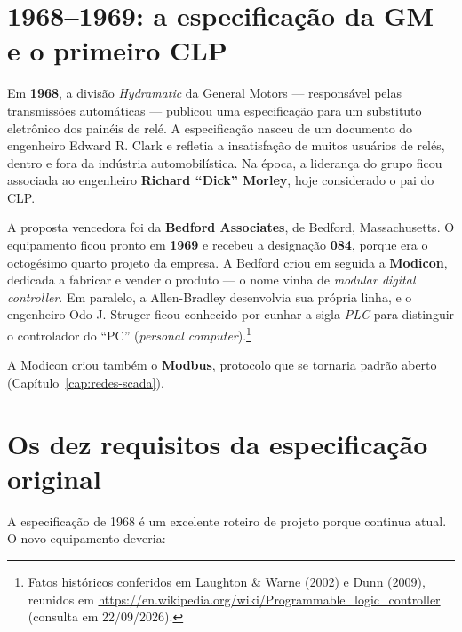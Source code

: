 
\section{1968--1969: a especificação da GM e o primeiro CLP}

Em \textbf{1968}, a divisão \emph{Hydramatic} da General Motors --- responsável pelas transmissões
automáticas --- publicou uma especificação para um substituto eletrônico dos painéis de relé. A
especificação nasceu de um documento do engenheiro Edward R. Clark e refletia a insatisfação de
muitos usuários de relés, dentro e fora da indústria automobilística. Na época, a liderança do
grupo ficou associada ao engenheiro \textbf{Richard ``Dick'' Morley}, hoje considerado o pai do CLP.

A proposta vencedora foi da \textbf{Bedford Associates}, de Bedford, Massachusetts. O equipamento
ficou pronto em \textbf{1969} e recebeu a designação \textbf{084}, porque era o octogésimo quarto
projeto da empresa. A Bedford criou em seguida a \textbf{Modicon}, dedicada a fabricar e vender o
produto --- o nome vinha de \emph{modular digital controller}. Em paralelo, a Allen-Bradley
desenvolvia sua própria linha, e o engenheiro Odo J. Struger ficou conhecido por cunhar a sigla
\emph{PLC} para distinguir o controlador do ``PC'' (\emph{personal computer}).\footnote{Fatos
históricos conferidos em Laughton \& Warne (2002) e Dunn (2009), reunidos em
\url{https://en.wikipedia.org/wiki/Programmable_logic_controller} (consulta em 22/09/2026).}

A Modicon criou também o \textbf{Modbus}, protocolo que se tornaria padrão aberto
(Capítulo~\ref{cap:redes-scada}).

\section{Os dez requisitos da especificação original}

A especificação de 1968 é um excelente roteiro de projeto porque continua atual. O novo
equipamento deveria:


